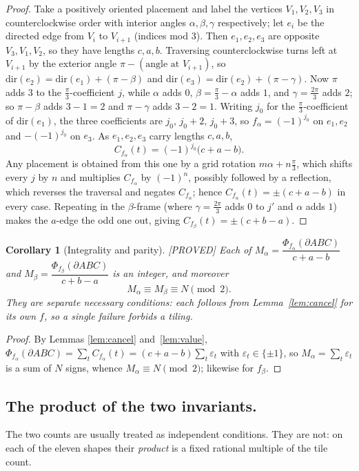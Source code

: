 \documentclass[11pt,reqno]{amsart}
\theoremstyle{plain}
\newtheorem{corollary}[theorem]{Corollary}
\theoremstyle{definition}
\newcommand{\lab}[1]{\hfill\textnormal{\footnotesize\textsc{[#1]}}}
\begin{document}
\begin{proof}
Take a positively oriented placement and label the vertices $V_1,V_2,V_3$ in counterclockwise
order with interior angles $\alpha,\beta,\gamma$ respectively; let $e_i$ be the directed edge from
$V_i$ to $V_{i+1}$ (indices mod $3$). Then $e_1,e_2,e_3$ are opposite $V_3,V_1,V_2$, so they have
lengths $c,a,b$. Traversing counterclockwise turns left at $V_{i+1}$ by the exterior angle
$\pi-(\text{angle at }V_{i+1})$, so
$\mathrm{dir}(e_2)=\mathrm{dir}(e_1)+(\pi-\beta)$ and
$\mathrm{dir}(e_3)=\mathrm{dir}(e_2)+(\pi-\gamma)$. Now $\pi$ adds $3$ to the $\frac\pi3$-coefficient
$j$, while $\alpha$ adds $0$, $\beta=\frac\pi3-\alpha$ adds $1$, and $\gamma=\frac{2\pi}3$ adds $2$;
so $\pi-\beta$ adds $3-1=2$ and $\pi-\gamma$ adds $3-2=1$. Writing $j_0$ for the
$\frac\pi3$-coefficient of $\mathrm{dir}(e_1)$, the three coefficients are $j_0,\,j_0+2,\,j_0+3$, so
$f_\alpha=(-1)^{j_0}$ on $e_1,e_2$ and $-(-1)^{j_0}$ on $e_3$. As $e_1,e_2,e_3$ carry lengths
$c,a,b$,
\[
C_{f_\alpha}(t)=(-1)^{j_0}\bigl(c+a-b\bigr).
\]
Any placement is obtained from this one by a grid rotation $m\alpha+n\frac\pi3$, which shifts every
$j$ by $n$ and multiplies $C_{f_\alpha}$ by $(-1)^n$, possibly followed by a reflection, which
reverses the traversal and negates $C_{f_\alpha}$; hence $C_{f_\alpha}(t)=\pm(c+a-b)$ in every case.
Repeating in the $\beta$-frame (where $\gamma=\frac{2\pi}3$ adds $0$ to $j'$ and $\alpha$ adds $1$)
makes the $a$-edge the odd one out, giving $C_{f_\beta}(t)=\pm(c+b-a)$.
\end{proof}

\begin{corollary}[Integrality and parity]\label{cor:int}\lab{PROVED}
Each of $M_\alpha=\dfrac{\Phi_{f_\alpha}(\partial ABC)}{c+a-b}$ and
$M_\beta=\dfrac{\Phi_{f_\beta}(\partial ABC)}{c+b-a}$ is an integer, and moreover
\[
M_\alpha\equiv M_\beta\equiv N \pmod 2 .
\]
They are separate necessary conditions: each follows from Lemma~\ref{lem:cancel} for its own $f$,
so a single failure forbids a tiling.
\end{corollary}

\begin{proof}
By Lemmas \ref{lem:cancel} and~\ref{lem:value}, $\Phi_{f_\alpha}(\partial ABC)=\sum_t C_{f_\alpha}(t)
=(c+a-b)\sum_t\varepsilon_t$ with $\varepsilon_t\in\{\pm1\}$, so $M_\alpha=\sum_t\varepsilon_t$
is a sum of $N$ signs, whence $M_\alpha\equiv N\pmod 2$; likewise for $f_\beta$.
\end{proof}

\subsection*{The product of the two invariants.}
The two counts are usually treated as independent conditions. They are not: on each of the eleven
shapes their \emph{product} is a fixed rational multiple of the tile count.
\end{document}
